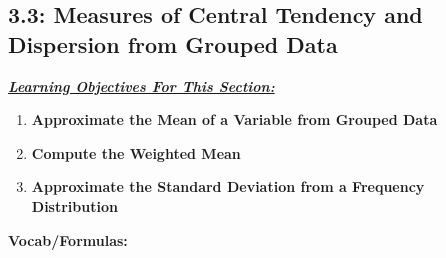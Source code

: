 \documentclass{report}
\begin{document}
         \subsection{3.3: Measures of Central Tendency and Dispersion from Grouped Data}
         \bigbreak \noindent 
         \textbf{\textit{\underline{Learning Objectives For This Section:}}}
         \begin{enumerate}
             \item \textbf{Approximate the Mean of a Variable from Grouped Data}
             \item \textbf{Compute the Weighted Mean}
             \item \textbf{Approximate the Standard Deviation from a Frequency Distribution}

         \end{enumerate}
         \bigbreak \noindent 
         \textbf{Vocab/Formulas:}
\end{document}
